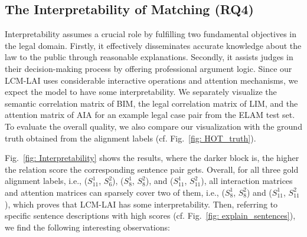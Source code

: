 \subsection{The Interpretability of Matching (RQ4)}\label{sec:interpretability}
Interpretability assumes a crucial role by fulfilling two fundamental objectives in the legal domain. 
Firstly, it effectively disseminates accurate knowledge about the law to the public through reasonable explanations. 
Secondly, it assists judges in their decision-making process by offering professional argument logic.
Since our LCM-LAI uses considerable interactive operations and attention mechanisms, we expect the model to have some interpretability.
We separately visualize the semantic correlation matrix of BIM, the legal correlation matrix of LIM, and the attention matrix of AIA for an example legal case pair from the ELAM test set.
To evaluate the overall quality, we also compare our visualization with the ground truth obtained from the alignment labels  (cf. Fig.~\ref{fig: HOT_truth}).


Fig.~\ref{fig: Interpretability} shows the results, where the darker block is, the higher the relation score the corresponding sentence pair gets. 
Overall, for all three gold alignment labels, i.e., ($S_{11}^{1}$, $S_{6}^{2}$), ($S_{8}^{1}$, $S_{8}^{2}$), and ($S_{11}^{1}$, $S_{11}^{2}$), all interaction matrices and attention matrices can sparsely cover two of them, i.e., ($S_{8}^{1}$, $S_{8}^{2}$) and ($S_{11}^{1}$, $S_{11}^{2}$), which proves that LCM-LAI has some interpretability.
Then, referring to specific sentence descriptions with high scores (cf. Fig.~\ref{fig: explain_sentences}), we find the following interesting observations:

\begin{figure*}[t]
\centering
\caption{The visualization of sentence alignment for an example in the ELAM test set.
(a) The human-labeled alignments;
(b), (c), and (d) The attention score visualization for semantic correlation matrix (cf. Sec~\ref{subsubsec: semantic correlation matrix}), legal correlation matrix (cf. Sec~\ref{subsubsec: law correlation matrix}), and legal correlation matrix combined with AIA (cf. Sec~\ref{subsubsec: law interaction encoder}); 
(e) The sentence pairs with ground-truth alignment labels or the highest interaction scores.
}
\label{fig: Interpretability}
\end{figure*}

